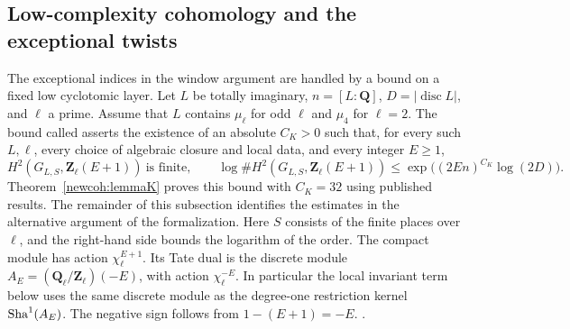 \subsection{Low-complexity cohomology and the exceptional twists}\label{sup:length}

The exceptional indices in the window argument are handled by a bound on a fixed low cyclotomic layer. Let \(L\) be totally imaginary, \(n=[L:\mathbf Q]\), \(D=|\operatorname{disc} L|\), and \(\ell\) a prime. Assume that \(L\) contains \(\mu_\ell\) for odd \(\ell\) and \(\mu_4\) for \(\ell=2\). The bound called  asserts the existence of an absolute \(C_K>0\) such that, for every such \(L,\ell\), every choice of algebraic closure and local data, and every integer \(E\ge1\),
\begin{equation}\label{sup:lemmaK}
 H^2(G_{L,S},\mathbf Z_\ell(E+1))\ \text{is finite},\qquad
 \log\#H^2(G_{L,S},\mathbf Z_\ell(E+1))
 \le \exp\bigl((2En)^{C_K}\log(2D)\bigr).
\end{equation}
Theorem~\ref{newcoh:lemmaK} proves this bound with \(C_K=32\) using published results. The remainder of this subsection identifies the estimates in the alternative argument of the formalization. Here \(S\) consists of the finite places over \(\ell\), and the right-hand side bounds the logarithm of the order. The compact module has action \(\chi_\ell^{E+1}\). Its Tate dual is the discrete module \(A_E=(\mathbf Q_\ell/\mathbf Z_\ell)(-E)\), with action \(\chi_\ell^{-E}\). In particular the local invariant term below uses the same discrete module as the degree-one restriction kernel \(\operatorname{Sha}^1(A_E)\). The negative sign follows from \(1-(E+1)=-E\). 
.

